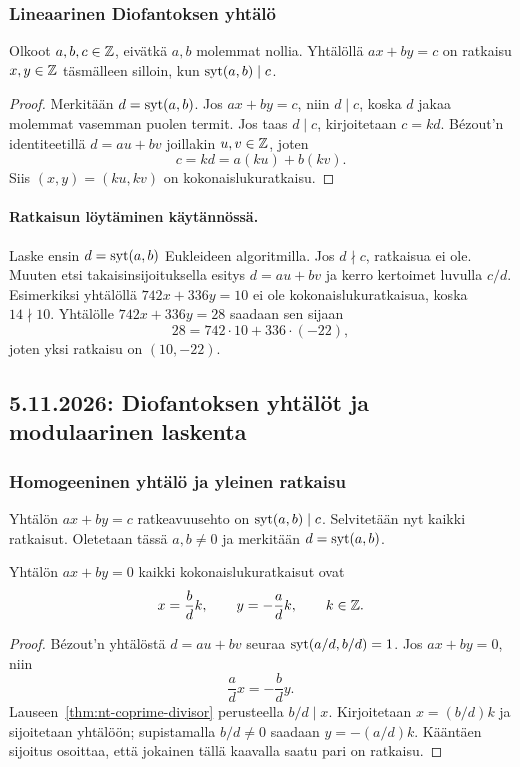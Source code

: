 \documentclass[11pt,a4paper]{amsart}
\begin{document}
\subsubsection{Lineaarinen Diofantoksen yhtälö}
\begin{theorem}
  Olkoot $a,b,c\in\mathbb{Z}$, eivätkä $a,b$ molemmat nollia.
  Yhtälöllä $ax+by=c$ on ratkaisu $x,y\in\mathbb{Z}$ täsmälleen silloin,
  kun $\operatorname{syt}(a,b)\mid c$.
\end{theorem}
\begin{proof}
  Merkitään $d=\operatorname{syt}(a,b)$. Jos $ax+by=c$, niin $d\mid c$,
  koska $d$ jakaa molemmat vasemman puolen termit.
  Jos taas $d\mid c$, kirjoitetaan $c=kd$. Bézout'n identiteetillä
  $d=au+bv$ joillakin $u,v\in\mathbb{Z}$, joten
  \[
    c=kd=a(ku)+b(kv).
  \]
  Siis $(x,y)=(ku,kv)$ on kokonaislukuratkaisu.
\end{proof}

\paragraph{Ratkaisun löytäminen käytännössä.}
Laske ensin $d=\operatorname{syt}(a,b)$ Eukleideen algoritmilla. Jos $d\nmid c$,
ratkaisua ei ole. Muuten etsi takaisinsijoituksella esitys $d=au+bv$
ja kerro kertoimet luvulla $c/d$.
Esimerkiksi yhtälöllä $742x+336y=10$ ei ole kokonaislukuratkaisua,
koska $14\nmid10$. Yhtälölle $742x+336y=28$ saadaan sen sijaan
\[
  28=742\cdot10+336\cdot(-22),
\]
joten yksi ratkaisu on $(10,-22)$.

\newpage
\subsection{5.11.2026: Diofantoksen yhtälöt ja modulaarinen laskenta}

\subsubsection{Homogeeninen yhtälö ja yleinen ratkaisu}
Yhtälön $ax+by=c$ ratkeavuusehto on $\operatorname{syt}(a,b)\mid c$.
Selvitetään nyt kaikki ratkaisut. Oletetaan tässä $a,b\ne0$ ja
merkitään $d=\operatorname{syt}(a,b)$.

\begin{theorem}
  Yhtälön $ax+by=0$ kaikki kokonaislukuratkaisut ovat
  \[
    x=\frac{b}{d}k,\qquad y=-\frac{a}{d}k,\qquad k\in\mathbb{Z}.
  \]
\end{theorem}
\begin{proof}
  Bézout'n yhtälöstä $d=au+bv$ seuraa $\operatorname{syt}(a/d,b/d)=1$.
  Jos $ax+by=0$, niin
  \[
    \frac{a}{d}x=-\frac{b}{d}y.
  \]
  Lauseen~\ref{thm:nt-coprime-divisor} perusteella $b/d\mid x$.
  Kirjoitetaan $x=(b/d)k$ ja sijoitetaan yhtälöön; supistamalla
  $b/d\ne0$ saadaan $y=-(a/d)k$. Kääntäen sijoitus osoittaa,
  että jokainen tällä kaavalla saatu pari on ratkaisu.
\end{proof}
\end{document}
